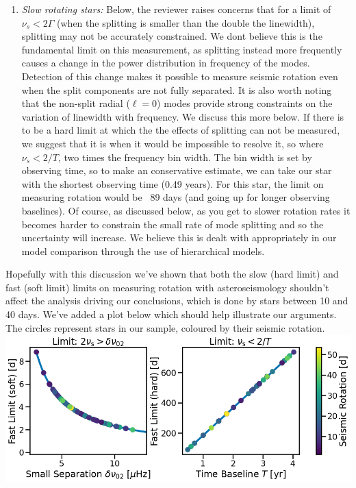 \documentclass[11pt]{article}
\begin{document}
\begin{enumerate}
\item \textit{Slow rotating stars:} Below, the reviewer raises concerns that for a limit of $\nu_s < 2\Gamma$ (when the splitting is smaller than the double the linewidth), splitting may not be accurately constrained. We dont believe this is the fundamental limit on this measurement, as splitting instead more frequently causes a change in the power distribution in frequency of the modes. Detection of this change makes it possible to measure seismic rotation even when the split components are not fully separated.  It is also worth noting that the non-split radial ($\ell=0$) modes provide strong constraints on the variation of linewidth with frequency. We discuss this more below. If there is to be a hard limit at which the the effects of splitting can not be measured, we suggest that it is when it would be impossible to resolve it, so where $\nu_s < 2/T$, two times the frequency bin width. The bin width is set by observing time, so to make an conservative estimate, we can take our star with the shortest observing time  (0.49 years). For this star, the limit on measuring rotation would be ~89 days (and going up for longer observing baselines). Of course, as discussed below, as you get to slower rotation rates it becomes harder to constrain the small rate of mode splitting and so the uncertainty will increase. We believe this is dealt with appropriately in our model comparison through the use of hierarchical models.
\end{enumerate}

Hopefully with this discussion we’ve shown that both the slow (hard limit) and fast (soft limit) limits on measuring rotation with asteroseismology shouldn’t affect the analysis driving our conclusions, which is done by stars between 10 and 40 days. We’ve added a plot below which should help illustrate our arguments. The circles represent stars in our sample, coloured by their seismic rotation.\\

\includegraphics[width=\textwidth]{image1.png}
\end{document}
